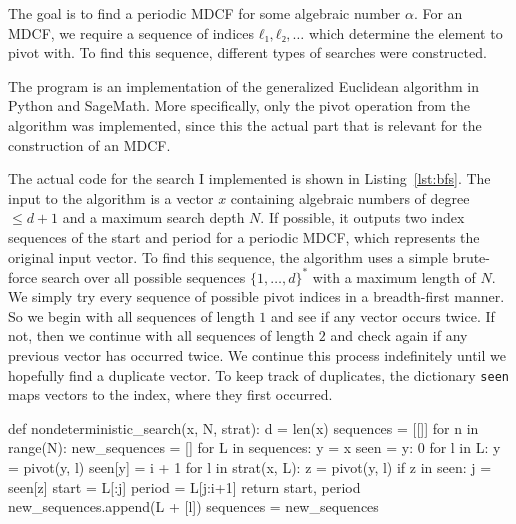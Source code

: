 The goal is to find a periodic MDCF for some algebraic number $α$.
For an MDCF, we require a sequence of indices $ℓ₁, ℓ₂, …$ which determine the
element to pivot with.
To find this sequence, different types of searches were constructed.

The program is an implementation of the generalized Euclidean algorithm
in Python and SageMath.
More specifically, only the pivot operation from the algorithm was implemented,
since this the actual part that is relevant for the construction of an MDCF.

The actual code for the search I implemented is shown in Listing~\ref{lst:bfs}.
The input to the algorithm is a vector $x$ containing algebraic numbers of
degree $≤ d+1$ and a maximum search depth $N$.
If possible, it outputs two index sequences of the start and period for a periodic MDCF,
which represents the original input vector.
To find this sequence, the algorithm uses a simple brute-force search over all
possible sequences $\{1,\dots,d\}^*$ with a maximum length of $N$.
We simply try every sequence of possible pivot indices in a breadth-first manner.
So we begin with all sequences of length $1$ and see if any vector occurs twice.
If not, then we continue with all sequences of length $2$ and check again if
any previous vector has occurred twice.
We continue this process indefinitely until we hopefully find a duplicate vector.
To keep track of duplicates, the dictionary \verb|seen| maps vectors to the index,
where they first occurred.

\begin{Python}[
    float=tbp,
    numbers=left,
    caption={
      The implementation of the nondeterministic search.
      The search begins with the empty sequence and then queries the strategy
      for the next valid sequences.
      At the same time, it checks whether any vector has occurred twice
      and stops once it has found a duplicate.
    },
    label={lst:nondet-search},
  ]
def nondeterministic_search(x, N, strat):
  d = len(x)
  sequences = [[]]
  for n in range(N):
    new_sequences = []
    for L in sequences:
      y = x
      seen = {y: 0}
      for l in L:
        y = pivot(y, l)
        seen[y] = i + 1
      for l in strat(x, L):
        z = pivot(y, l)
        if z in seen:
          j = seen[z]
          start = L[:j]
          period = L[j:i+1]
          return start, period
        new_sequences.append(L + [l])
    sequences = new_sequences
\end{Python}

